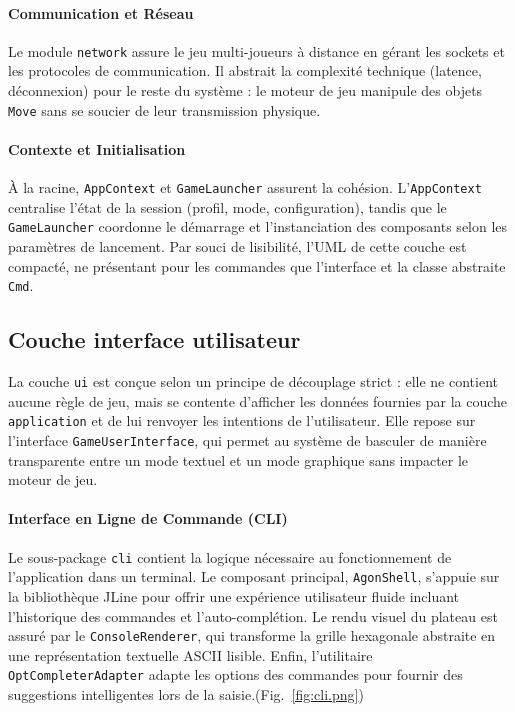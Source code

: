 \documentclass[a4paper]{article}
\begin{document}
\paragraph{Communication et Réseau}
Le module \texttt{network} assure le jeu multi-joueurs à distance en gérant les sockets et les protocoles de communication. Il abstrait la complexité technique (latence, déconnexion) pour le reste du système : le moteur de jeu manipule des objets \texttt{Move} sans se soucier de leur transmission physique.

\paragraph{Contexte et Initialisation}
À la racine, \texttt{AppContext} et \texttt{GameLauncher} assurent la cohésion. L'\texttt{AppContext} centralise l'état de la session (profil, mode, configuration), tandis que le \texttt{GameLauncher} coordonne le démarrage et l'instanciation des composants selon les paramètres de lancement. Par souci de lisibilité, l'UML de cette couche est compacté, ne présentant pour les commandes que l'interface et la classe abstraite \texttt{Cmd}.

\subsection{Couche interface utilisateur}
La couche \texttt{ui} est conçue selon un principe de découplage strict : elle ne contient aucune règle de jeu, mais se contente d'afficher les données fournies par la couche \texttt{application} et de lui renvoyer les intentions de l'utilisateur. Elle repose sur l'interface \texttt{GameUserInterface}, qui permet au système de basculer de manière transparente entre un mode textuel et un mode graphique sans impacter le moteur de jeu.

\paragraph{Interface en Ligne de Commande (CLI)}
Le sous-package \texttt{cli} contient la logique nécessaire au fonctionnement de l'application dans un terminal. Le composant principal, \texttt{AgonShell}, s'appuie sur la bibliothèque JLine pour offrir une expérience utilisateur fluide incluant l'historique des commandes et l'auto-complétion. Le rendu visuel du plateau est assuré par le \texttt{ConsoleRenderer}, qui transforme la grille hexagonale abstraite en une représentation textuelle ASCII lisible. Enfin, l'utilitaire \texttt{OptCompleterAdapter} adapte les options des commandes pour fournir des suggestions intelligentes lors de la saisie.(Fig.~\ref{fig:cli.png})
\end{document}
